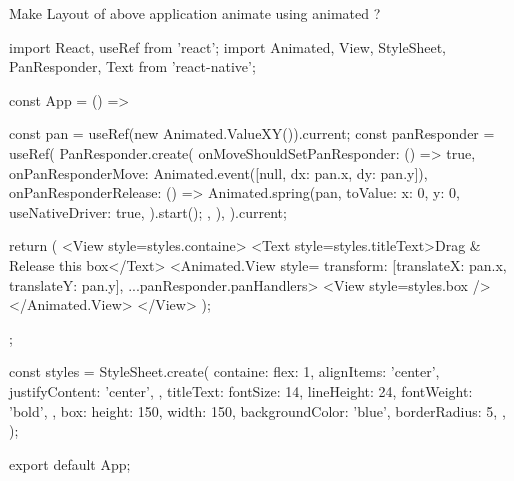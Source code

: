 Make Layout of above application animate using animated ?

import React, {useRef} from 'react';
import {Animated, View, StyleSheet, PanResponder, Text} from 'react-native';

const App = () => {
  const pan = useRef(new Animated.ValueXY()).current;
  const panResponder = useRef(
    PanResponder.create({
      onMoveShouldSetPanResponder: () => true,
      onPanResponderMove: Animated.event([null, {dx: pan.x, dy: pan.y}]),
      onPanResponderRelease: () => {
        Animated.spring(pan, {
          toValue: {x: 0, y: 0},
          useNativeDriver: true,
        }).start();
      },
    }),
  ).current;

  return (
    <View style={styles.containe}>
      <Text style={styles.titleText}>Drag & Release this box</Text>
      <Animated.View
        style={{
          transform: [{translateX: pan.x}, {translateY: pan.y}],
        }}
        {...panResponder.panHandlers}>
        <View style={styles.box} />
      </Animated.View>
    </View>
  );
};

const styles = StyleSheet.create({
  containe: {
    flex: 1,
    alignItems: 'center',
    justifyContent: 'center',
  },
  titleText: {
    fontSize: 14,
    lineHeight: 24,
    fontWeight: 'bold',
  },
  box: {
    height: 150,
    width: 150,
    backgroundColor: 'blue',
    borderRadius: 5,
  },
});

export default App;